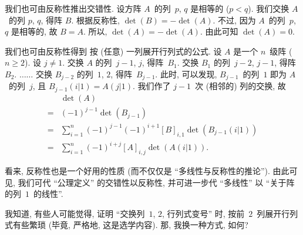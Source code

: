 \documentclass[%
    UTF8,%
    fontset=none,%
    punct=kaiming,%
    zihao=-4,%
    a4paper,%
    oneside,%
]{ctexbook}
\renewcommand*{\geq}{\geqslant}
\begin{document}
我们也可由反称性推出交错性.
设方阵 \(A\)~的列~\(p\), \(q\) 是相等的 (\(p < q\)).
我们交换 \(A\)~的列 \(p\), \(q\), 得阵 \(B\).
根据反称性, \(\det {(B)} = -\det {(A)}\).
不过, 因为 \(A\)~的列~\(p\), \(q\) 是相等的,
故 \(B = A\).
所以, \(\det {(A)} = -\det {(A)}\).
由此可知 \(\det {(A)} = 0\).

我们也可由反称性得到%
按 (任意) 一列展开行列式的公式.
设 \(A\) 是一个 \(n\)~级阵 (\(n \geq 2\)).
设 \(j \neq 1\).
交换 \(A\) 的列~\(j-1\), \(j\), 得阵~\(B_1\).
交换 \(B_1\) 的列~\(j-2\), \(j-1\), 得阵~\(B_2\).
\(\dots \dots\)
交换 \(B_{j-2}\) 的列~\(1\), \(2\), 得阵~\(B_{j-1}\).
此时, 可以发现,
\(B_{j-1}\)~的列~\(1\) 即为 \(A\)~的列~\(j\),
且 \(B_{j-1}(i|1) = A(j|1)\).
我们作了 \(j-1\)~次 (相邻的) 列的交换,
故
\begin{align*}
         & \det {(A)}
    \\
    = {} & (-1)^{j-1} \det {(B_{j-1})}
    \\
    = {} & \sum_{i = 1}^{n}
    {(-1)^{j-1} (-1)^{i+1} [B]_{i,1} \det {(B_{j-1}(i|1))}}
    \\
    = {} & \sum_{i = 1}^{n}
    {(-1)^{i+j} [A]_{i,j} \det {(A(i|1))}}.
\end{align*}

看来, 反称性也是一个好用的性质
(而不仅仅是 ``多线性与反称性的推论'').
由此可见, 我们可代 ``公理定义''
的交错性以反称性,
并可进一步代 ``多线性'' 以
``关于阵的列~\(1\)~的线性''.

\vspace{2ex}

我知道, 有些人可能觉得,
证明
``交换列~\(1\), \(2\), 行列式变号'' 时,
按前~\(2\)~列展开行列式有些繁琐
(毕竟, 严格地, 这是选学内容).
那, 我换一种方式, 如何?
\end{document}
